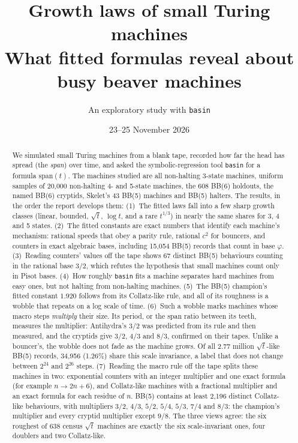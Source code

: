 \documentclass[11pt,a4paper]{article}
\title{Growth laws of small Turing machines\\[2pt]
\large What fitted formulas reveal about busy beaver machines}
\author{An exploratory study with \texttt{basin}}
\date{23--25 November 2026}
\newcommand{\BB}[1]{BB(#1)}
\begin{document}
\maketitle

\begin{abstract}
We simulated small Turing machines from a blank tape, recorded how far the head has
spread (the \emph{span}) over time, and asked the symbolic-regression tool \texttt{basin} for
a formula $\mathrm{span}(t)$. The machines studied are all non-halting 3-state machines, uniform
samples of 20,000 non-halting 4- and 5-state machines, the 608 \BB{6} holdouts, the named \BB{6}
cryptids, Skelet's 43 \BB{5} machines and \BB{5} halters. The results, in the order the report
develops them:
(1)~The fitted laws fall into a few sharp growth classes (linear, bounded, $\sqrt t$, $\log t$,
and a rare $t^{1/3}$) in nearly the same shares for 3, 4 and 5 states.
(2)~The fitted constants are exact numbers that identify each machine's mechanism: rational speeds
that obey a parity rule, rational $c^2$ for bouncers, and counters in exact algebraic bases,
including 15,054 \BB{5} records that count in base $\varphi$.
(3)~Reading counters' values off the tape shows 67 distinct \BB{5} behaviours counting in the
rational base $3/2$, which refutes the hypothesis that small machines count only in Pisot bases.
(4)~How roughly \texttt{basin} fits a machine separates hard machines from easy ones, but not
halting from non-halting machines.
(5)~The \BB{5} champion's fitted constant $1.920$ follows from its Collatz-like rule, and all of
its roughness is a wobble that repeats on a log scale of time.
(6)~Such a wobble marks machines whose macro steps \emph{multiply} their size. Its period, or the
span ratio between its teeth, measures the multiplier: Antihydra's $3/2$ was predicted from its
rule and then measured, and the cryptids give $3/2$, $4/3$ and $8/3$, confirmed on their tapes.
Unlike a bouncer's, the wobble does not fade as the machine grows. Of all 2.77 million
$\sqrt t$-like \BB{5} records, 34,956 (1.26\%) share this scale invariance, a label that does not
change between $2^{24}$ and $2^{26}$ steps.
(7)~Reading the macro rule off the tape splits these machines in two: exponential counters with
an integer multiplier and one exact formula (for example $n \to 2n+6$), and Collatz-like machines
with a fractional multiplier and an exact formula for each residue of $n$. \BB{5} contains at least
2,196 distinct Collatz-like behaviours, with multipliers $3/2$, $4/3$, $5/2$, $5/4$, $5/3$, $7/4$ and
$8/3$: the champion's multiplier and every cryptid multiplier except $9/8$. The three views agree: the
six roughest of 638 census $\sqrt t$ machines are exactly the six scale-invariant ones, four
doublers and two Collatz-like.
\end{abstract}
\end{document}
